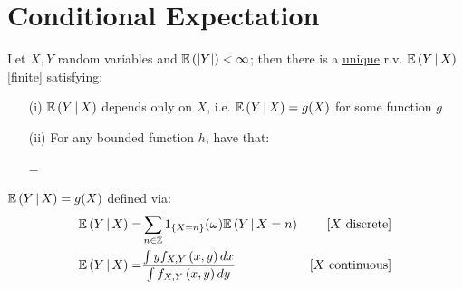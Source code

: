 \documentclass[12pt]{extarticle}
\begin{document}
\pagebreak
\section{Conditional Expectation}
\begin{tcolorbox}[colback=white]
    \begin{theorem}
        Let $X,Y$ random variables and $\mathbb{E}\left(|Y|\right)<\infty$; then there is a \ul{unique} r.v. $\mathbb{E}\left(Y\,\vert\,X\right)$ [finite] satisfying: \begin{enumerate}
            \item[(i)] $\mathbb{E}\left(Y\,\vert\,X\right)$ depends only on $X$, i.e. $\mathbb{E}\left(Y\,\vert\,X\right)=g(X)$ for some function $g$
            \item[(ii)] For any bounded function $h$, have that: \begin{eqnbox}
                =
            \end{eqnbox}
        \end{enumerate}
    \end{theorem}
\end{tcolorbox}

\vspace{8pt}
\begin{recall} 
    $\mathbb{E}\left(Y\,\vert\,X\right)=g(X)$ defined via: \begin{align*}
        \mathbb{E}\left(Y\,\vert\,X\right)=&\sum_{n\in\mathbb{Z}}1_{\{X=n\}}(\omega)\mathbb{E}\left(Y\,\vert\,X=n\right) &\text{[$X$ discrete]}\\
        \mathbb{E}\left(Y\,\vert\,X\right)=&\frac{\int yf_{X,Y}\left(x,y\right)dx}{\int f_{X,Y}\left(x,y\right)dy} &\text{[$X$ continuous]}
    \end{align*}
\end{recall}
\vspace{8pt}
\end{document}
